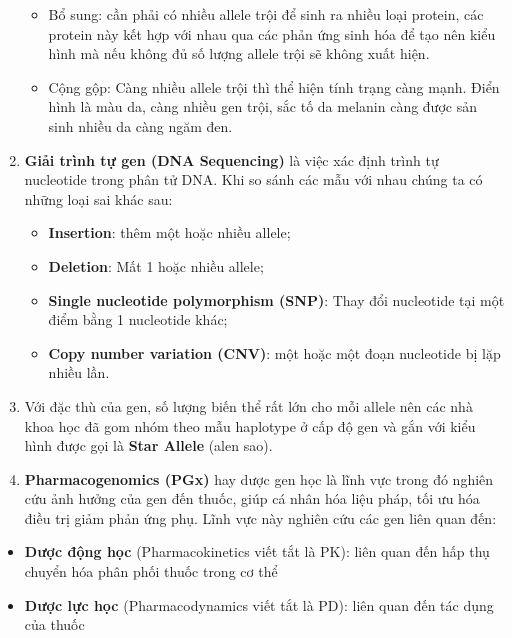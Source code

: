 \documentclass[14pt,oneside]{scrbook}
\providecommand{\tightlist}{\setlength{\itemsep}{\smallskipamount}\setlength{\parskip}{\smallskipamount}}
\begin{document}
\begin{enumerate}
  \begin{itemize}
  \tightlist
  \item
    Bổ sung: cần phải có nhiều allele trội để sinh ra nhiều loại
    protein, các protein này kết hợp với nhau qua các phản ứng sinh hóa
    để tạo nên kiểu hình mà nếu không đủ số lượng allele trội sẽ không
    xuất hiện.
  \item
    Cộng gộp: Càng nhiều allele trội thì thể hiện tính trạng càng mạnh.
    Điển hình là màu da, càng nhiều gen trội, sắc tố da melanin càng
    được sản sinh nhiều da càng ngăm đen.
  \end{itemize}
\item
  \textbf{Giải trình tự gen (DNA Sequencing)} là việc xác định trình tự
  nucleotide trong phân tử DNA. Khi so sánh các mẫu với nhau chúng ta có
  những loại sai khác sau:

  \begin{itemize}
  \tightlist
  \item
    \textbf{Insertion}: thêm một hoặc nhiều allele;
  \item
    \textbf{Deletion}: Mất 1 hoặc nhiều allele;
  \item
    \textbf{Single nucleotide polymorphism (SNP)}: Thay đổi nucleotide
    tại một điểm bằng 1 nucleotide khác;
  \item
    \textbf{Copy number variation (CNV)}: một hoặc một đoạn nucleotide
    bị lặp nhiều lần.
  \end{itemize}
\item
  Với đặc thù của gen, số lượng biến thể rất lớn cho mỗi allele nên các
  nhà khoa học đã gom nhóm theo mẫu haplotype ở cấp độ gen và gắn với
  kiểu hình được gọi là \textbf{Star Allele} (alen sao).
\item
  \textbf{Pharmacogenomics (PGx)} hay dược gen học là lĩnh vực trong đó
  nghiên cứu ảnh hưởng của gen đến thuốc, giúp cá nhân hóa liệu pháp,
  tối ưu hóa điều trị giảm phản ứng phụ. Lĩnh vực này nghiên cứu các gen
  liên quan đến:
\end{enumerate}

\begin{itemize}
\tightlist
\item
  \textbf{Dược động học} (Pharmacokinetics viết tắt là PK): liên quan
  đến hấp thụ chuyển hóa phân phối thuốc trong cơ thể
\item
  \textbf{Dược lực học} (Pharmacodynamics viết tắt là PD): liên quan đến
  tác dụng của thuốc
\end{itemize}
\end{document}
